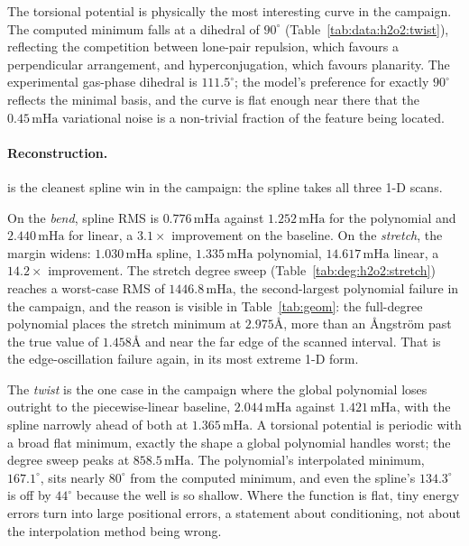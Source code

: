 \documentclass[sigconf,screen,nonacm]{acmart}
\newcommand{\mHa}{\,\text{mHa}}
\newcommand{\Ang}{\text{\AA}}
\begin{document}
The torsional potential is physically the most interesting curve in the
campaign. The computed minimum falls at a dihedral of $90^\circ$
(Table~\ref{tab:data:h2o2:twist}), reflecting the competition between
lone-pair repulsion, which favours a perpendicular arrangement, and
hyperconjugation, which favours planarity. The experimental gas-phase
dihedral is $111.5^\circ$; the model's preference for exactly $90^\circ$
reflects the minimal basis, and the curve is flat enough near there that the
$0.45\mHa$ variational noise is a non-trivial fraction of the feature being
located.








\paragraph{Reconstruction.}
 is the cleanest spline win in the campaign: the spline takes all
three 1-D scans.

On the \emph{bend}, spline RMS is $0.776\mHa$ against $1.252\mHa$ for the
polynomial and $2.440\mHa$ for linear, a $3.1\times$ improvement on the
baseline. On the \emph{stretch}, the margin widens: $1.030\mHa$ spline,
$1.335\mHa$ polynomial, $14.617\mHa$ linear, a $14.2\times$ improvement. The
stretch degree sweep (Table~\ref{tab:deg:h2o2:stretch}) reaches a worst-case
RMS of $1446.8\mHa$, the second-largest polynomial failure in the campaign,
and the reason is visible in Table~\ref{tab:geom}: the full-degree polynomial
places the stretch minimum at $2.975\Ang$, more than an \AA ngstr\"om past
the true value of $1.458\Ang$ and near the far edge of the scanned interval.
That is the  edge-oscillation failure again, in its most extreme
1-D form.

The \emph{twist} is the one case in the campaign where the global polynomial
loses outright to the piecewise-linear baseline, $2.044\mHa$ against
$1.421\mHa$, with the spline narrowly ahead of both at $1.365\mHa$. A
torsional potential is periodic with a broad flat minimum, exactly the shape
a global polynomial handles worst; the degree sweep peaks at $858.5\mHa$.
The polynomial's interpolated minimum, $167.1^\circ$, sits nearly $80^\circ$
from the computed minimum, and even the spline's $134.3^\circ$ is off by
$44^\circ$ because the well is so shallow. Where the function is flat, tiny
energy errors turn into large positional errors, a statement about
conditioning, not about the interpolation method being wrong.
\end{document}
